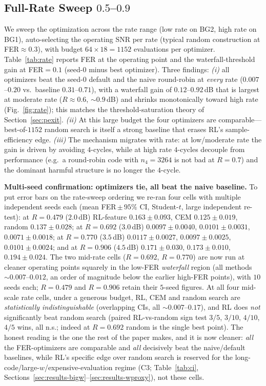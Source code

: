 \documentclass[journal]{IEEEtran}
\begin{document}
\subsection{Full-Rate Sweep $0.5$--$0.9$}\label{sec:results-rate}
We sweep the optimization across the rate range (low rate on BG2, high rate on
BG1), auto-selecting the operating SNR per rate (typical random construction at
FER$\approx0.3$), with budget $64\times18 = 1152$ evaluations per optimizer.
Table~\ref{tab:rate} reports FER at the operating point and the waterfall-threshold
gain at FER$=0.1$ (seed-0 minus best optimizer). Three findings:
\emph{(i)} all optimizers beat the seed-0 default and the naive round-robin at
\emph{every} rate ($0.007$--$0.20$ vs.\ baseline $0.31$--$0.71$), with a
waterfall gain of $0.12$--$0.92$\,dB that is largest at moderate rate
($R\approx0.6$, $\sim\!0.9$\,dB) and shrinks monotonically toward high rate
(Fig.~\ref{fig:rate}); this matches the threshold-saturation theory of
Section~\ref{sec:pexit}. \emph{(ii)} At this large budget the four optimizers are
comparable---best-of-$1152$ random search is itself a strong baseline that
erases RL's sample-efficiency edge. \emph{(iii)} The mechanism migrates with
rate: at low/moderate rate the gain is driven by avoiding $4$-cycles, while at
high rate $4$-cycles decouple from performance (e.g.\ a round-robin code with
$n_4=3264$ is not bad at $R=0.7$) and the dominant harmful structure is no longer
the $4$-cycle.

\textbf{Multi-seed confirmation: optimizers tie, all beat the naive baseline.}
To put error bars on the rate-sweep ordering we re-ran four cells with
multiple independent seeds each (mean FER\,$\pm$\,$95\%$ CI, Student-$t$, large
independent re-test): at $R{=}0.479$ ($2.0$\,dB) RL-feature
$0.163\pm0.093$, CEM $0.125\pm0.019$, random $0.137\pm0.028$; at $R{=}0.692$
($3.0$\,dB) $0.0097\pm0.0040$, $0.0101\pm0.0031$, $0.0071\pm0.0018$; at
$R{=}0.770$ ($3.5$\,dB) $0.0117\pm0.0027$, $0.0097\pm0.0025$, $0.0101\pm0.0024$;
and at $R{=}0.906$ ($4.5$\,dB) $0.171\pm0.030$, $0.173\pm0.010$,
$0.194\pm0.024$. The two mid-rate cells ($R{=}0.692$, $R{=}0.770$) are now run at
cleaner operating points squarely in the low-FER \emph{waterfall} region (all
methods $\sim\!0.007$--$0.012$, an order of magnitude below the earlier high-FER
points), with $10$ seeds each; $R{=}0.479$ and $R{=}0.906$ retain their $5$-seed
figures. At all four mid-scale rate cells, under a generous budget, RL, CEM and
random search are \emph{statistically indistinguishable} (overlapping CIs, all
$\sim\!0.007$--$0.17$), and RL does \emph{not} significantly beat random search
(paired RL-vs-random sign test $3/5$, $3/10$, $4/10$, $4/5$ wins, all n.s.;
indeed at $R{=}0.692$ random is the single best point). The honest reading is the
one the rest of the paper makes, and it is now cleaner: \emph{all} the
FER-optimizers are comparable and \emph{all} decisively beat the naive/default
baselines, while RL's specific edge over random search is reserved for the
long-code/large-$w$/expensive-evaluation regime
(C3; Table~\ref{tab:ci}, Sections~\ref{sec:results-bigw}--\ref{sec:results-wproxy}),
not these cells.
\end{document}
